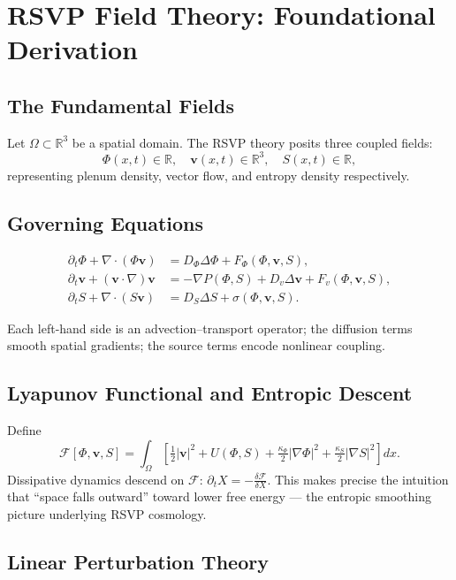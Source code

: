 \documentclass[11pt, openany]{book}
\theoremstyle{plain}
\theoremstyle{definition}
\theoremstyle{remark}
\newcommand{\R}{\mathbb{R}}
\begin{document}
\chapter{RSVP Field Theory: Foundational Derivation}

\section{The Fundamental Fields}

Let $\Omega\subset\R^3$ be a spatial domain. The RSVP theory posits three
coupled fields:
\[
  \Phi(x,t)\in\R,\quad
  \mathbf{v}(x,t)\in\R^3,\quad
  S(x,t)\in\R,
\]
representing plenum density, vector flow, and entropy density respectively.

\section{Governing Equations}

\begin{align}
  \partial_t\Phi+\nabla\cdot(\Phi\mathbf{v})
  &= D_\Phi\Delta\Phi+F_\Phi(\Phi,\mathbf{v},S), \tag{A}\\
  \partial_t\mathbf{v}+(\mathbf{v}\cdot\nabla)\mathbf{v}
  &= -\nabla P(\Phi,S)+D_v\Delta\mathbf{v}+F_v(\Phi,\mathbf{v},S), \tag{B}\\
  \partial_t S+\nabla\cdot(S\mathbf{v})
  &= D_S\Delta S+\sigma(\Phi,\mathbf{v},S). \tag{C}
\end{align}

Each left-hand side is an advection--transport operator; the diffusion terms
smooth spatial gradients; the source terms encode nonlinear coupling.

\section{Lyapunov Functional and Entropic Descent}

Define
\[
  \mathcal{F}[\Phi,\mathbf{v},S]
  =\int_\Omega\!\left[
    \tfrac12|\mathbf{v}|^2
    +U(\Phi,S)
    +\tfrac{\kappa_\Phi}{2}|\nabla\Phi|^2
    +\tfrac{\kappa_S}{2}|\nabla S|^2
  \right]dx.
\]
Dissipative dynamics descend on $\mathcal{F}$:
$\partial_t X = -\frac{\delta\mathcal{F}}{\delta X}$.
This makes precise the intuition that ``space falls outward'' toward lower
free energy --- the entropic smoothing picture underlying RSVP cosmology.

\section{Linear Perturbation Theory}
\end{document}
